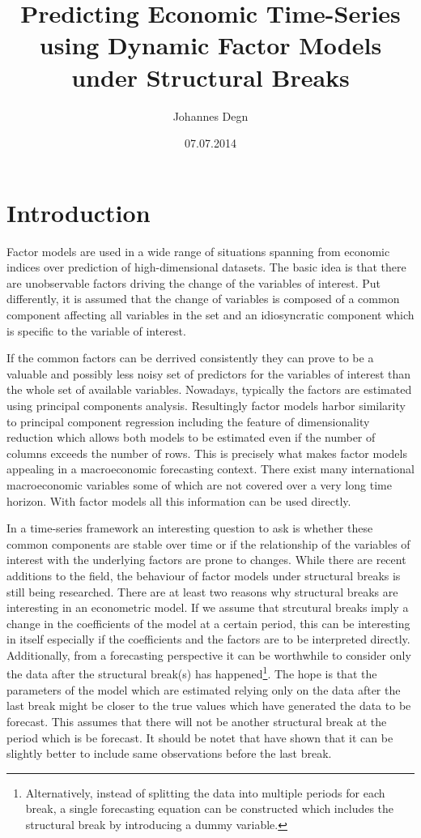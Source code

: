 \documentclass[11pt]{article}
\title{\textbf{Predicting Economic Time-Series using Dynamic Factor Models under Structural Breaks}}
\author{Johannes Degn}
\date{07.07.2014}
\begin{document}
\maketitle
\thispagestyle{empty}
\setcounter{page}{0fac}

\newpage
\tableofcontents
\newpage
\listoffigures
\listoftables
\newpage




\section{Introduction}
Factor models are used in a wide range of situations spanning from economic indices over prediction of high-dimensional datasets. The basic idea is that there are unobservable factors driving the change of the variables of interest. Put differently, it is assumed that the change of variables is composed of a common component affecting all variables in the set and an idiosyncratic component which is specific to the variable of interest.

If the common factors can be derrived consistently they can prove to be a valuable and possibly less noisy set of predictors for the variables of interest than the whole set of available variables. Nowadays, typically the factors are estimated using principal components analysis. Resultingly factor models harbor similarity to principal component regression including the feature of dimensionality reduction which allows both models to be estimated even if the number of columns exceeds the number of rows. This is precisely what makes factor models appealing in a macroeconomic forecasting context. There exist many international macroeconomic variables some of which are not covered over a very long time horizon. With factor models all this information can be used directly.

In a time-series framework an interesting question to ask is whether these common components are stable over time or if the relationship of the variables of interest with the underlying factors are prone to changes. While there are recent additions to the field, the behaviour of factor models under structural breaks is still being researched. There are at least two reasons why structural breaks are interesting in an econometric model. If we assume that strcutural breaks imply a change in the coefficients of the model at a certain period, this can be interesting in itself especially if the coefficients and the factors are to be interpreted directly. Additionally, from a forecasting perspective it can be worthwhile to consider only the data after the structural break(s) has happened\footnote{Alternatively, instead of splitting the data into multiple periods for each break, a single forecasting equation can be constructed which includes the structural break by introducing a dummy variable.}. The hope is that the parameters of the model which are estimated relying only on the data after the last break might be closer to the true values which have generated the data to be forecast. This assumes that there will not be another structural break at the period which is be forecast. It should be notet that \citet{pesaran2007selection} have shown that it can be slightly better to include same observations before the last break.
\end{document}
